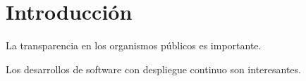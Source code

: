 \chapter{Introducción}

La transparencia en los organismos públicos es importante.

Los desarrollos de software con despliegue continuo son interesantes.